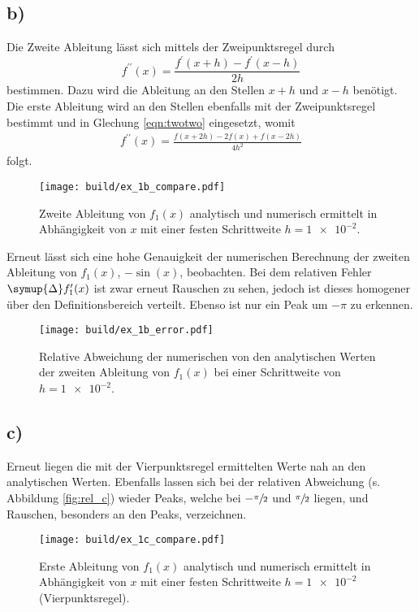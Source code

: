 \subsection*{b)}
Die Zweite Ableitung lässt sich mittels der Zweipunktsregel durch 
\begin{equation}
    f^{\prime \prime} (x) = \frac{f^{\prime}(x+h) - f^{\prime}(x-h)}{2h} \label{eqn:twotwo}
\end{equation}
bestimmen.
Dazu wird die Ableitung an den Stellen $x+h$ und $x-h$ benötigt.
Die erste Ableitung wird an den Stellen ebenfalls mit der 
Zweipunktsregel bestimmt und in Glechung \eqref{eqn:twotwo} eingesetzt,
womit
\begin{align*}
    f^{\prime \prime} (x) = \frac{f(x+2h) - 2 f(x) + f(x-2h)}{4h^2}
\end{align*}
folgt.
\begin{figure}
    \centering
    \texttt{[image: build/ex\_1b\_compare.pdf]}
    \caption{Zweite Ableitung von $f_1(x)$ analytisch und numerisch ermittelt in Abhängigkeit von 
    $x$ mit einer festen Schrittweite $h=\num{1e-2}$.}
    \label{fig:b_comp}
\end{figure}
Erneut lässt sich eine hohe Genauigkeit der numerischen Berechnung 
der zweiten Ableitung von $f_1(x)$, $- \sin(x)$, beobachten.
Bei dem relativen Fehler $\symup{\Delta} f^{\prime}_1(x)$  ist zwar erneut Rauschen zu sehen, jedoch ist dieses 
homogener über den Definitionsbereich verteilt. 
Ebenso ist nur ein Peak um $-\pi$ zu erkennen.
\begin{figure}
    \centering
    \texttt{[image: build/ex\_1b\_error.pdf]}
    \caption{Relative Abweichung der numerischen von den analytischen Werten der zweiten Ableitung von $f_1(x)$
    bei einer Schrittweite von $h=\num{1e-2}$.}
    \label{fig:rel_b}
\end{figure}
\FloatBarrier
\subsection*{c)}
Erneut liegen die mit der Vierpunktsregel ermittelten Werte nah an den analytischen Werten.
Ebenfalls lassen sich bei der relativen Abweichung (s. Abbildung \ref{fig:rel_c}) wieder Peaks, 
welche bei $-\sfrac{\pi}{2}$ und $\sfrac{\pi}{2}$ liegen, und
Rauschen, besonders an den Peaks, verzeichnen.

\begin{figure}
    \centering
    \texttt{[image: build/ex\_1c\_compare.pdf]}
    \caption{Erste Ableitung von $f_1(x)$ analytisch und numerisch ermittelt in Abhängigkeit von 
    $x$ mit einer festen Schrittweite $h=\num{1e-2}$ (Vierpunktsregel).}
    \label{fig:c_comp}
\end{figure}

